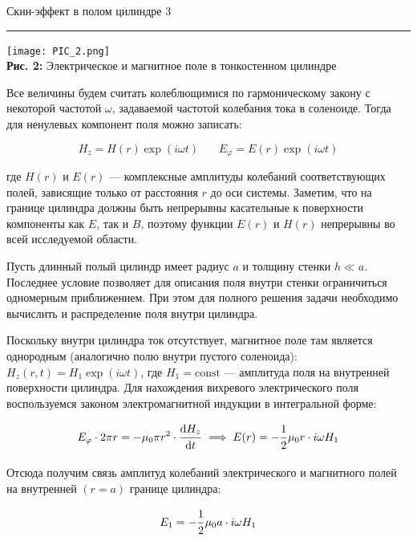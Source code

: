 \documentclass[12pt,a4paper]{scrartcl}
\begin{document}
	
	\newpage
	
	
	\begin{flushleft}
		\footnotesize{Скин-эффект в полом цилиндре} \hspace{\fill} \footnotesize{3}
		\\[-0.3cm]\noindent\rule{\textwidth}{0.3pt}
	\end{flushleft}
	
	\begin{center}
		\texttt{[image: PIC\_2.png]}
		\\\textbf{Рис. 2:} Электрическое и магнитное поле в тонкостенном цилиндре
	\end{center}
	
	Все	величины будем считать колеблющимися по гармоническому закону с некоторой частотой $\omega$, задаваемой частотой колебания тока в соленоиде. Тогда для ненулевых компонент поля можно записать:
	
	$$H_z = H(r)\exp(i\omega t)\ \ \ \ \ \ \ \ E_\varphi = E(r)\exp(i\omega t)$$
	
	где $H(r)$ и $E(r)$ — комплексные амплитуды колебаний соответствующих полей, зависящие только от расстояния $r$ до оси системы. Заметим, что на границе цилиндра должны быть непрерывны касательные к поверхности компоненты как $E$, так и $B$, поэтому функции $E(r)$ и $H(r)$ непрерывны во всей исследуемой области.
	
	Пусть длинный полый цилиндр имеет радиус $a$ и толщину стенки $h \ll a$. Последнее условие позволяет для описания поля внутри стенки	ограничиться одномерным приближением. При этом для полного решения задачи необходимо вычислить и распределение поля внутри цилиндра.
	
	Поскольку внутри цилиндра ток отсутствует, магнитное поле там является однородным (аналогично полю внутри пустого соленоида): $H_z(r, t) = H_1 \exp(i \omega t)$, где $H_1 = \mathrm{const}$ — амплитуда поля на внутренней поверхности цилиндра. Для нахождения вихревого электрического поля воспользуемся законом электромагнитной индукции в интегральной форме:
	
	$$E_\varphi \cdot 2\pi r = -\mu_0 \pi r^2 \cdot \dfrac{\strut \mathrm{d} H_z}{\strut \mathrm{d} t} \implies E(r) = -\dfrac{\strut 1}{\strut 2} \mu_0 r \cdot i \omega H_1$$
	
	Отсюда получим связь амплитуд колебаний электрического и магнитного полей на внутренней $(r = a)$ границе цилиндра:
	
	$$E_1 = -\dfrac{\strut 1}{\strut 2} \mu_0 a \cdot i \omega H_1$$
	
\end{document}
